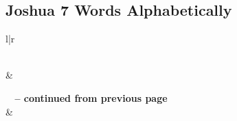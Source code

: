 

\subsection{Joshua 7 Words Alphabetically}


\normalsize
 
\begin{center}
\begin{longtable}{l|r}
\caption[Joshua 7 Words Alphabetically]{Joshua 7 Words Alphabetically}\label{table:WordsAlphabetically for Joshua 7} \\
\hline {} &  \\ \hline 
\endfirsthead
 
{{\bfseries \tablename\ \thetable{} -- continued from previous page}} \\  
\hline {} &  \\ \hline 
\endhead
 

\end{longtable}
\end{center}
